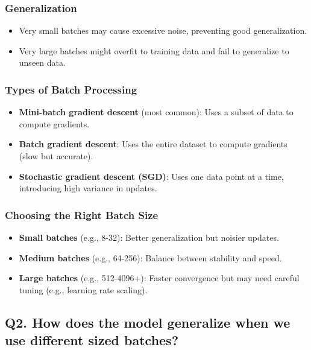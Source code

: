 \documentclass{article}
\begin{document}
\subsubsection{Generalization}
\begin{itemize}
    \item Very small batches may cause excessive noise, preventing good generalization.
    \item Very large batches might overfit to training data and fail to generalize to unseen data.
\end{itemize}

\subsubsection{Types of Batch Processing}
\begin{itemize}
    \item \textbf{Mini-batch gradient descent} (most common): Uses a subset of data to compute gradients.
    \item \textbf{Batch gradient descent}: Uses the entire dataset to compute gradients (slow but accurate).
    \item \textbf{Stochastic gradient descent (SGD)}: Uses one data point at a time, introducing high variance in updates.
\end{itemize}

\subsubsection{Choosing the Right Batch Size}
\begin{itemize}
    \item \textbf{Small batches} (e.g., 8-32): Better generalization but noisier updates.
    \item \textbf{Medium batches} (e.g., 64-256): Balance between stability and speed.
    \item \textbf{Large batches} (e.g., 512-4096+): Faster convergence but may need careful tuning (e.g., learning rate scaling).
\end{itemize}




\subsection{Q2. How does the model generalize when we use different sized batches?}
\end{document}
